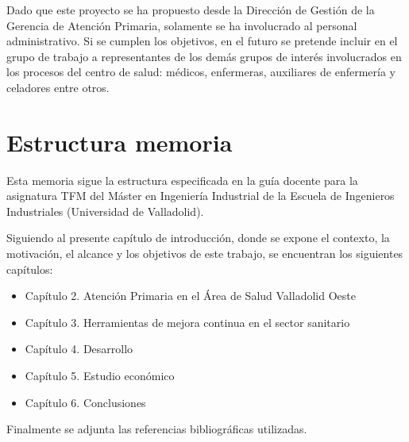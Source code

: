 Dado que este proyecto se ha propuesto desde la Dirección de Gestión de la Gerencia de Atención Primaria, solamente se ha involucrado al personal administrativo. Si se cumplen los objetivos, en el futuro se pretende incluir en el grupo de trabajo a representantes de los demás grupos de interés involucrados en los procesos del centro de salud: médicos, enfermeras, auxiliares de enfermería y celadores entre otros.

\section{Estructura memoria}

Esta memoria sigue la estructura especificada en la guía docente para la asignatura TFM del Máster en Ingeniería Industrial de la Escuela de Ingenieros Industriales (Universidad de Valladolid).

Siguiendo al presente capítulo de introducción, donde se expone el contexto, la motivación, el alcance y los objetivos de este trabajo, se encuentran los siguientes capítulos:

\begin{itemize}
    \item Capítulo 2. Atención Primaria en el Área de Salud Valladolid Oeste
    \item Capítulo 3. Herramientas de mejora continua en el sector sanitario
    \item Capítulo 4. Desarrollo
    \item Capítulo 5. Estudio económico
    \item Capítulo 6. Conclusiones
\end{itemize}

Finalmente se adjunta las referencias bibliográficas utilizadas.
